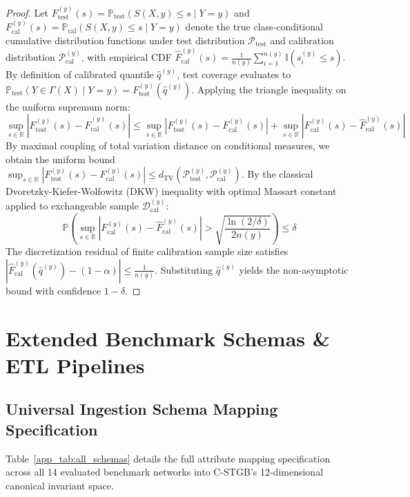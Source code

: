 \begin{proof}
Let $F_{\text{test}}^{(y)}(s) = \mathbb{P}_{\text{test}}(S(X, y) \le s \mid Y=y)$ and $F_{\text{cal}}^{(y)}(s) = \mathbb{P}_{\text{cal}}(S(X, y) \le s \mid Y=y)$ denote the true class-conditional cumulative distribution functions under test distribution $\mathcal{P}_{\text{test}}$ and calibration distribution $\mathcal{P}_{\text{cal}}^{(y)}$, with empirical CDF $\hat{F}_{\text{cal}}^{(y)}(s) = \frac{1}{n(y)} \sum_{i=1}^{n(y)} \mathbb{I}(s_i^{(y)} \le s)$. By definition of calibrated quantile $\hat{q}^{(y)}$, test coverage evaluates to $\mathbb{P}_{\text{test}}(Y \in \Gamma(X) \mid Y=y) = F_{\text{test}}^{(y)}(\hat{q}^{(y)})$. Applying the triangle inequality on the uniform supremum norm:
\begin{equation}
\sup_{s \in \mathbb{R}} \left| F_{\text{test}}^{(y)}(s) - \hat{F}_{\text{cal}}^{(y)}(s) \right| \le \sup_{s \in \mathbb{R}} \left| F_{\text{test}}^{(y)}(s) - F_{\text{cal}}^{(y)}(s) \right| + \sup_{s \in \mathbb{R}} \left| F_{\text{cal}}^{(y)}(s) - \hat{F}_{\text{cal}}^{(y)}(s) \right|
\end{equation}
By maximal coupling of total variation distance on conditional measures, we obtain the uniform bound $\sup_{s \in \mathbb{R}} |F_{\text{test}}^{(y)}(s) - F_{\text{cal}}^{(y)}(s)| \le d_{\mathrm{TV}}\allowbreak(\mathcal{P}_{\text{test}}^{(y)}, \mathcal{P}_{\text{cal}}^{(y)})$.
By the classical Dvoretzky-Kiefer-Wolfowitz (DKW) inequality with optimal Massart constant~\cite{massart1990tight} applied to exchangeable sample $\mathcal{D}_{\text{cal}}^{(y)}$:
\begin{equation}
\mathbb{P}\left( \sup_{s \in \mathbb{R}} \left| F_{\text{cal}}^{(y)}(s) - \hat{F}_{\text{cal}}^{(y)}(s) \right| > \sqrt{\frac{\ln(2/\delta)}{2 n(y)}} \right) \le \delta
\end{equation}
The discretization residual of finite calibration sample size satisfies $|\hat{F}_{\text{cal}}^{(y)}(\hat{q}^{(y)}) - (1 - \alpha)| \le \frac{1}{n(y)}$. Substituting $\hat{q}^{(y)}$ yields the non-asymptotic bound with confidence $1 - \delta$.
\end{proof}

\chapter{Extended Benchmark Schemas \& ETL Pipelines}
\label{app:schemas}

\section{Universal Ingestion Schema Mapping Specification}
Table~\ref{app_tab:all_schemas} details the full attribute mapping specification across all 14 evaluated benchmark networks into C-STGB's 12-dimensional canonical invariant space.

